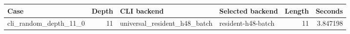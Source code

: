 {\small
\begin{tabular}{lrllrr}
\hline
Case & Depth & CLI backend & Selected backend & Length & Seconds \\
\hline
cli\_random\_depth\_11\_0 & 11 & universal\_resident\_h48\_batch & resident-h48-batch & 11 & 3.847198 \\
\hline
\end{tabular}
}

